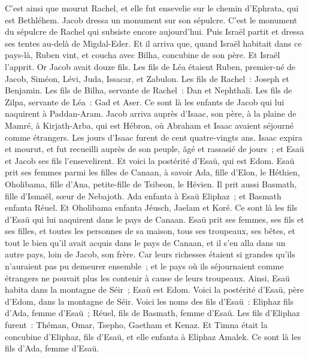 \begin{multicols}{2}
C'est ainsi que mourut Rachel, et elle fut ensevelie sur le chemin d'Ephrata, qui est Bethléhem.
Jacob dressa un monument sur son sépulcre. C'est le monument du sépulcre de Rachel qui subsiste encore aujourd'hui.
Puis Israël partit et dressa ses tentes au-delà de Migdal-Eder.
Et il arriva que, quand Israël habitait dans ce pays-là, Ruben vint, et coucha avec Bilha, concubine de son père. Et Israël l'apprit. Or Jacob avait douze fils.
Les fils de Léa étaient Ruben, premier-né de Jacob, Siméon, Lévi, Juda, Issacar, et Zabulon.
Les fils de Rachel~: Joseph et Benjamin.
Les fils de Bilha, servante de Rachel~: Dan et Nephthali.
Les fils de Zilpa, servante de Léa~: Gad et Aser. Ce sont là les enfants de Jacob qui lui naquirent à Paddan-Aram.
Jacob arriva auprès d'Isaac, son père, à la plaine de Mamré, à Kirjath-Arba, qui est Hébron, où Abraham et Isaac avaient séjourné comme étrangers.
Les jours d'Isaac furent de cent quatre-vingts ans.
Isaac expira et mourut, et fut recueilli auprès de son peuple, âgé et rassasié de jours~; et Esaü et Jacob ses fils l'ensevelirent.
\VerseOne{}Et voici la postérité d'Esaü, qui est Edom.
Esaü prit ses femmes parmi les filles de Canaan, à savoir Ada, fille d'Elon, le Héthien, Oholibama, fille d'Ana, petite-fille de Tsibeon, le Hévien.
Il prit aussi Basmath, fille d'Ismaël, sœur de Nebajoth.
Ada enfanta à Esaü Eliphaz~; et Basmath enfanta Réuel.
Et Oholibama enfanta Jéusch, Jaelam et Koré. Ce sont là les fils d'Esaü qui lui naquirent dans le pays de Canaan.
Esaü prit ses femmes, ses fils et ses filles, et toutes les personnes de sa maison, tous ses troupeaux, ses bêtes, et tout le bien qu'il avait acquis dans le pays de Canaan, et il s'en alla dans un autre pays, loin de Jacob, son frère.
Car leurs richesses étaient si grandes qu'ils n'auraient pas pu demeurer ensemble~; et le pays où ils séjournaient comme étrangers ne pouvait plus les contenir à cause de leurs troupeaux.
Ainsi, Esaü habita dans la montagne de Séir~; Esaü est Edom.
Voici la postérité d'Esaü, père d'Edom, dans la montagne de Séir.
Voici les noms des fils d'Esaü~: Eliphaz fils d'Ada, femme d'Esaü~; Réuel, fils de Basmath, femme d'Esaü.
Les fils d'Eliphaz furent~: Théman, Omar, Tsepho, Gaetham et Kenaz.
Et Timna était la concubine d'Eliphaz, fils d'Esaü, et elle enfanta à Eliphaz Amalek. Ce sont là les fils d'Ada, femme d'Esaü.

\end{multicols}
